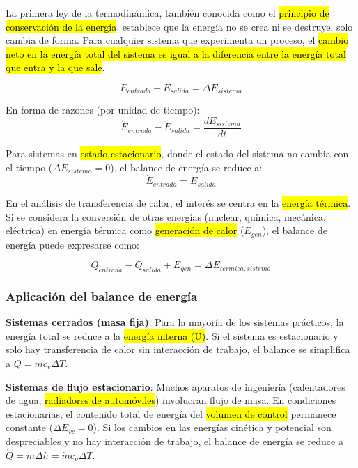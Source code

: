 \documentclass{article}
\begin{document}
    La primera ley de la termodinámica, también conocida como el \hl{principio de conservación de la energía}, establece que la energía no se crea ni se destruye, solo cambia de forma. Para cualquier sistema que experimenta un proceso, el \hl{cambio neto en la energía total del sistema es igual a la diferencia entre la energía total que entra y la que sale}.

    \begin{equation}
    E_{entrada} - E_{salida} = \Delta E_{sistema}
    \end{equation}

    En forma de razones (por unidad de tiempo): 
    \begin{equation}
    \dot{E}_{entrada} - \dot{E}_{salida} = \frac{dE_{sistema}}{dt}
    \end{equation}

    Para sistemas en \hl{estado estacionario}, donde el estado del sistema no cambia con el tiempo ($\Delta E_{sistema} = 0$), el balance de energía se reduce a: 
    \begin{equation}
    \dot{E}_{entrada} = \dot{E}_{salida}
    \end{equation}

    En el análisis de transferencia de calor, el interés se centra en la \hl{energía térmica}. Si se considera la conversión de otras energías (nuclear, química, mecánica, eléctrica) en energía térmica como \hl{generación de calor} ($E_{gen}$), el balance de energía puede expresarse como:

    \begin{equation}
    Q_{entrada} - Q_{salida} + E_{gen} = \Delta E_{termica,sistema}
    \end{equation}

    \subsubsection{Aplicación del balance de energía}

    \textbf{Sistemas cerrados (masa fija)}: Para la mayoría de los sistemas prácticos, la energía total se reduce a la \hl{energía interna (U)}. Si el sistema es estacionario y solo hay transferencia de calor sin interacción de trabajo, el balance se simplifica a $Q = mc_v \Delta T$.

    \textbf{Sistemas de flujo estacionario}: Muchos aparatos de ingeniería (calentadores de agua, \hl{radiadores de automóviles}) involucran flujo de masa. En condiciones estacionarias, el contenido total de energía del \hl{volumen de control} permanece constante ($\Delta E_{vc} = 0$). Si los cambios en las energías cinética y potencial son despreciables y no hay interacción de trabajo, el balance de energía se reduce a $\dot{Q} = \dot{m} \Delta h = \dot{m} c_p \Delta T$.
\end{document}
